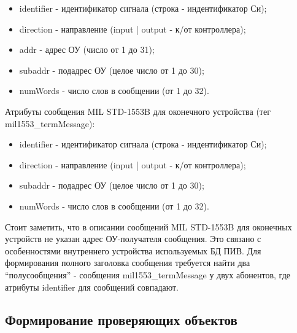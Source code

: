 \begin{itemize}
 \item identifier - идентификатор сигнала (строка - индентификатор Си);
 \item direction - направление (input | output - к/от контроллера);
 \item addr  - адрес ОУ (число от 1 до 31);
 \item subaddr - подадрес ОУ (целое число от 1 до 30);
 \item numWords - число слов в сообщении (от 1 до 32).
\end{itemize}

Атрибуты сообщения MIL STD-1553B для оконечного устройства (тег 
mil1553\_termMessage):

\begin{itemize}
 \item identifier - идентификатор сигнала (строка - индентификатор Си);
 \item direction - направление (input | output - к/от контроллера);
 \item subaddr - подадрес ОУ (целое число от 1 до 30);
 \item numWords - число слов в сообщении (от 1 до 32).
\end{itemize}

Стоит заметить, что в описании сообщений MIL STD-1553B для оконечных устройств 
не указан адрес ОУ-получателя сообщения. Это связано с особенностями 
внутреннего устройства используемых БД ПИВ. Для формирования полного заголовка 
сообщения требуется найти два ``полусообщения'' - сообщения 
mil1553\_termMessage у двух абонентов, где атрибуты identifier для сообщений 
совпадают.

\subsection{Формирование проверяющих объектов}

